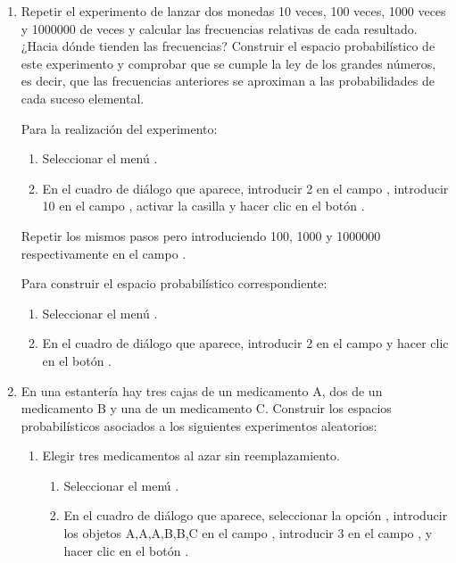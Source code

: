 \begin{enumerate}[leftmargin=*]
\item Repetir el experimento de lanzar dos monedas 10 veces, 100 veces, 1000 veces y 1000000 de veces y calcular las frecuencias relativas
de cada resultado. 
¿Hacia dónde tienden las frecuencias? 
Construir el espacio probabilístico de este experimento y comprobar que se cumple la ley de los grandes números, es decir, que las
frecuencias anteriores se aproximan a las probabilidades de cada suceso elemental.
\begin{indicacion}
Para la realización del experimento:
\begin{enumerate}
\item Seleccionar el menú .
\item En el cuadro de diálogo que aparece, introducir 2 en el campo , introducir 10 en el campo , activar la casilla  y hacer clic en el botón .
\end{enumerate}
Repetir los mismos pasos pero introduciendo 100, 1000 y 1000000 respectivamente en el campo .

Para construir el espacio probabilístico correspondiente:
\begin{enumerate}
\item Seleccionar el menú .
\item En el cuadro de diálogo que aparece, introducir 2 en el campo  y hacer clic en el botón .
\end{enumerate}
\end{indicacion}

\item En una estantería hay tres cajas de un medicamento A, dos de un medicamento B y una de un medicamento C. 
Construir los espacios probabilísticos asociados a los siguientes experimentos aleatorios:
\begin{enumerate}
\item Elegir tres medicamentos al azar sin reemplazamiento. 
\begin{indicacion}
\begin{enumerate}
\item Seleccionar el menú .
\item En el cuadro de diálogo que aparece, seleccionar la opción , introducir los objetos A,A,A,B,B,C en
el campo , introducir 3 en el campo , y hacer clic en el botón .
\end{enumerate}
\end{indicacion}


\end{enumerate}
\end{enumerate}
